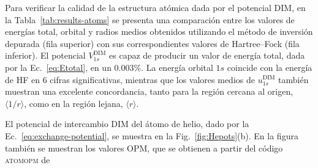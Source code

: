 Para verificar la calidad de la estructura atómica dada por el potencial 
DIM, en la Tabla~\ref{tab:results-atoms} se presenta una comparación 
entre los valores de energías total, orbital y radios medios obtenidos 
utilizando el método de inversión depurada (fila superior) con sus 
correspondientes valores de Hartree--Fock (fila inferior). El potencial 
$V_{1s}^{\mathrm{ DIM}}$ es capaz de producir un valor de energía total, 
dada por la Ec.~\ref{eq:Etotal}, en un $0.003\%$. La energía orbital 
$1s$ coincide con la energía de HF en 6 cifras significativas, mientras 
que los valores medios de $u_{1s}^{\mathrm{DIM}}$ también muestran una 
excelente concordancia, tanto para la región cercana al origen, 
$\langle 1/r\rangle$, como en la región lejana, $\langle r\rangle$.

El potencial de intercambio DIM del átomo de helio, dado por la 
Ec.~\ref{eq:exchange-potential}, se muestra en la 
Fig.~\ref{fig:Hepots}(b). En la figura también se muestran los valores 
OPM, que se obtienen a partir del código \textsc{atomopm} de 
